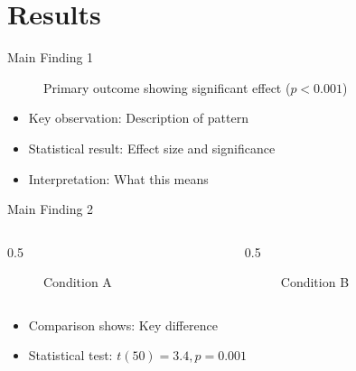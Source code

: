 \documentclass[aspectratio=169,11pt]{beamer}
\begin{document}

\section{Results}

\begin{frame}{Main Finding 1}
  \begin{figure}
    \centering
    \caption{Primary outcome showing significant effect ($p < 0.001$)}
  \end{figure}

  \vspace{0.3cm}

  \begin{itemize}
    \item<2-> Key observation: Description of pattern
    \item<3-> Statistical result: Effect size and significance
    \item<4-> Interpretation: What this means
  \end{itemize}
\end{frame}

\begin{frame}{Main Finding 2}
  \begin{columns}[c]

    \begin{column}{0.5\textwidth}
      \begin{figure}
        \centering
        \framebox[0.9\textwidth][c]{[Result 2A]}
        \caption{Condition A}
      \end{figure}
    \end{column}

    \begin{column}{0.5\textwidth}
      \begin{figure}
        \centering
        \framebox[0.9\textwidth][c]{[Result 2B]}
        \caption{Condition B}
      \end{figure}
    \end{column}

  \end{columns}

  \vspace{0.5cm}

  \begin{itemize}
    \item Comparison shows: Key difference
    \item Statistical test: $t(50) = 3.4, p = 0.001$
  \end{itemize}
\end{frame}
\end{document}

